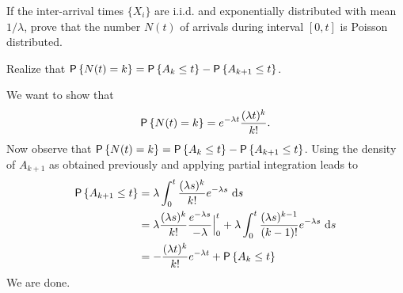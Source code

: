 \begin{question}
  If the inter-arrival times $\{X_i\}$ are i.i.d. and exponentially
  distributed with mean $1/\lambda$, prove that the number $N(t)$ of
  arrivals during interval $[0,t]$ is Poisson distributed.
  \begin{hint}
  Realize that
    $\P{N(t)=k} = \P{A_k \leq t} - \P{A_{k+1} \leq t}$.
  \end{hint}
    \begin{solution}
      We want to show that
    \begin{equation*}
      \P{N(t)=k} = e^{-\lambda t}\frac{(\lambda t)^k}{k!}.
    \end{equation*}
    Now observe that
    $\P{N(t)=k} = \P{A_k \leq t} - \P{A_{k+1} \leq t}$.  Using the
    density of $A_{k+1}$ as obtained previously and applying partial
    integration leads to
\begin{equation*}
  \begin{split}
\P{A_{k+1} \leq t} 
&= \lambda \int_0^t \frac{(\lambda s)^{k}}{k!}e^{-\lambda s}\, \d s \\
&= \lambda \frac{(\lambda s)^{k}}{k!}\frac{e^{-\lambda s}}{-\lambda} \Big|_{0}^t + \lambda \int_0^t \frac{(\lambda s)^{k-1}}{(k-1)!}e^{-\lambda s}\, \d s \\
&= - \frac{(\lambda t)^{k}}{k!} e^{-\lambda t} + \P{A_k \leq t}
  \end{split}
\end{equation*}
We are done.
    \end{solution}
\end{question}




